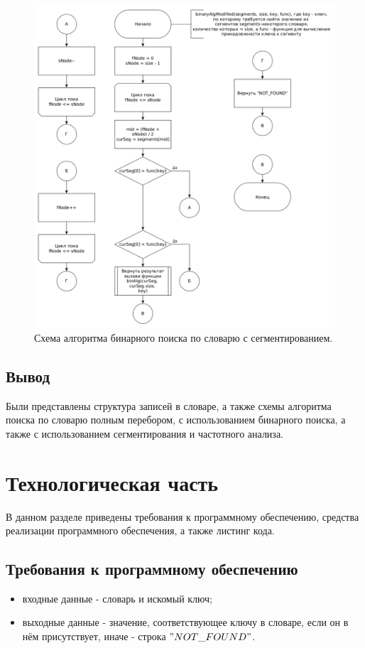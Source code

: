 \documentclass[12pt]{report}
\begin{document}
\begin{figure}
\begin{center}
\includegraphics[scale=0.4]{inc/img/binAlgUpd.png}
\captionsetup{justification=centering}
	\caption{Схема алгоритма бинарного поиска по словарю с сегментированием.}
	\label{img:binAlgUpd}	
\end{center}
\end{figure}

\section*{Вывод}
Были представлены структура записей в словаре, а также схемы алгоритма поиска по словарю полным перебором, с использованием бинарного поиска, а также с использованием сегментирования и частотного анализа.

\chapter{Технологическая часть}
В данном разделе приведены требования к программному обеспечению, средства реализации программного обеспечения, а также листинг кода.

\section{Требования к программному обеспечению}
\begin{itemize}
\item входные данные - словарь и искомый ключ;
\item выходные данные - значение, соответствующее ключу в словаре, если он в нём присутствует, иначе - строка $"NOT\_FOUND"$.
\end{itemize}
\end{document}
